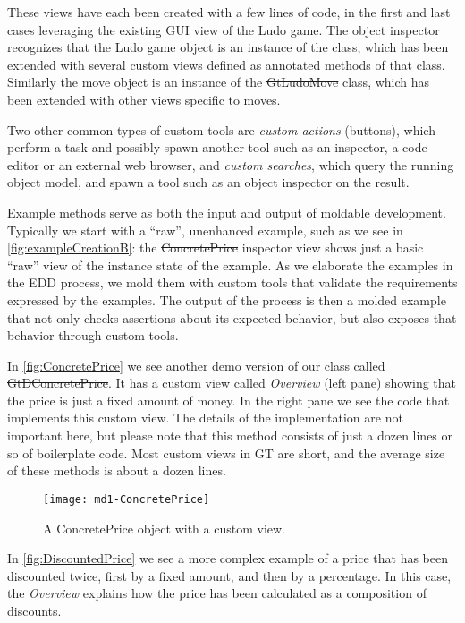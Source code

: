 \documentclass[sigplan,anonymous,review,10pt]{acmart}
\begin{document}
These views have each been created with a few lines of code, in the first and last cases leveraging the existing GUI view of the Ludo game.
The object inspector recognizes that the Ludo game object is an instance of the  class, 
which has been extended with several custom views defined as annotated methods of that class.
Similarly the move object is an instance of the \st{GtLudoMove} class, which has been extended with other views specific to moves.

Two other common types of custom tools are \emph{custom actions} (\eg buttons), which perform a task and possibly spawn another tool such as an inspector, a code editor or an external web browser, and \emph{custom searches}, which query the running object model, and spawn a tool such as an object inspector on the result.

Example methods serve as both the input and output of moldable development.
Typically we start with a ``raw'', unenhanced example, such as we see in \autoref{fig:exampleCreationB}: the \st{ConcretePrice} inspector view shows just a basic ``raw'' view of the instance state of the example.
As we elaborate the examples in the EDD process, we mold them with custom tools that validate the requirements expressed by the examples.
The output of the process is then a molded example that not only checks assertions about its expected behavior, but also exposes that behavior through custom tools.

In \autoref{fig:ConcretePrice} we see another demo version of our  class called \st{GtDConcretePrice}.
It has a custom view called \emph{Overview} (left pane) showing that the price is just a fixed amount of money.
In the right pane we see the code that implements this custom view.
The details of the implementation are not important here, but please note that this method consists of just a dozen lines or so of boilerplate code.
Most custom views in GT are short, and the average size of these methods is about a dozen lines.

\begin{figure}[h]
  \texttt{[image: md1-ConcretePrice]}
  \caption{A ConcretePrice object with a custom view.}
  \label{fig:ConcretePrice}
\end{figure}

In \autoref{fig:DiscountedPrice} we see a more complex example of a price that has been discounted twice, first by a fixed amount, and then by a percentage.
In this case, the \emph{Overview} explains how the price has been calculated as a composition of discounts.
\end{document}
